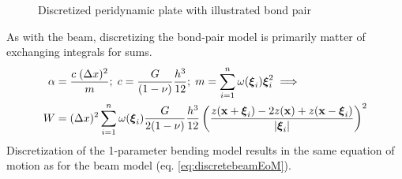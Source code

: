 %
\begin{figure}[h]
  \centering
{}
\caption{Discretized peridynamic plate with illustrated bond pair}
\label{fig:discretePlate}
\end{figure}
%
As with the beam, discretizing the bond-pair model is primarily matter of exchanging integrals for sums. 
%
%
\begin{align}
    \alpha &= \frac{c\; (\Delta x)^2}{m} ;\; c= \frac{G}{(1-\nu)}\frac{h^3}{12};\; m=\sum_{i=1}^n \omega(\boldsymbol{\xi}_i)\boldsymbol{\xi}_i^2 \implies \nonumber \\
    W&=(\Delta x)^2 \sum_{i=1}^n \omega(\boldsymbol{\xi}_i)\frac{G}{2(1-\nu)}\frac{h^3}{12}\left(\frac{z(\mathbf{x}+\boldsymbol{\xi}_i)-2z(\mathbf{x})+z(\mathbf{x}-\boldsymbol{\xi}_i)}{|\boldsymbol{\xi}_i|}\right)^2 \notag
\end{align}
%
Discretization of the 1-parameter bending model results in the same equation of motion as for the beam model (eq. \ref{eq:discretebeamEoM}).
%
%

